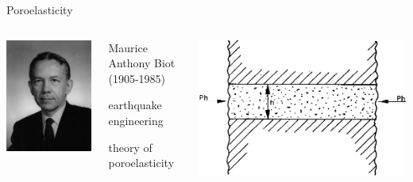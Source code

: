 \begin{frame}{Poroelasticity}
\begin{columns}
\includegraphics[width=\textwidth]{Maurice_Anthony_Biot}
\begin{block}{Maurice Anthony Biot (1905-1985)}
\begin{description}[1803]
\item[1932-1942] earthquake engineering
\item[1935-1962] theory of poroelasticity
\end{description}
\end{block}
\includegraphics[width=\textwidth]{Biot_1964_Buckling_Porous}
\end{columns}


\end{frame}
